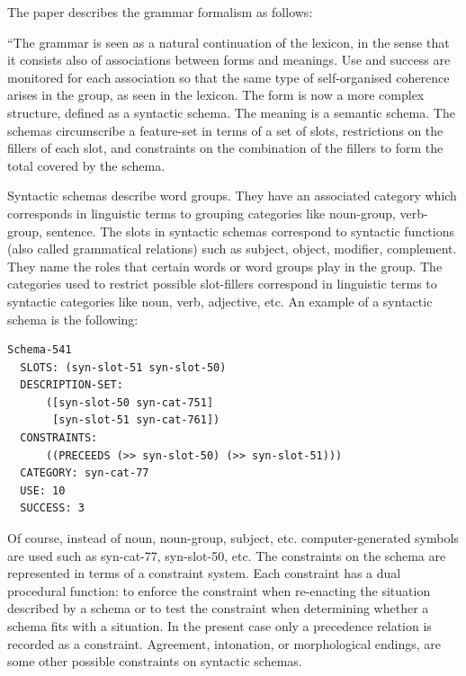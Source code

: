 The paper describes the grammar formalism as follows:

``The grammar is seen as a natural continuation of the lexicon, in the sense that it consists also of associations between forms and meanings. Use and success are monitored for each association so that the same type of self-organised coherence arises in the group, as seen in the lexicon. The form is now a more complex structure, defined as a syntactic schema. The meaning is a semantic schema. The schemas
circumscribe a feature-set in terms of a set of slots, restrictions	
on the fillers of each slot, and constraints	on the combination	
of the fillers to form the total covered by the schema. 

Syntactic schemas describe word groups. They have an associated category which corresponds in linguistic terms to grouping categories like noun-group, verb-group, sentence. The slots in syntactic schemas correspond to syntactic functions (also called grammatical relations) such as subject, object, modifier, complement. They name the roles that certain words or word groups play in the group. The categories used to restrict possible slot-fillers correspond in linguistic terms to syntactic categories like noun, verb, adjective, etc. An example of a syntactic schema is the following:
\begin{verbatim}
Schema-541 
  SLOTS: (syn-slot-51 syn-slot-50) 
  DESCRIPTION-SET: 
      ([syn-slot-50 syn-cat-751] 
       [syn-slot-51 syn-cat-761])
  CONSTRAINTS:
      ((PRECEEDS (>> syn-slot-50) (>> syn-slot-51)))
  CATEGORY: syn-cat-77 
  USE: 10 
  SUCCESS: 3
\end{verbatim}
Of course, instead of noun, noun-group, subject, etc. computer-generated symbols are used such 
as syn-cat-77, syn-slot-50, etc. The constraints on the schema are represented in terms of
a constraint system. Each constraint
has a dual procedural function: to enforce the constraint when re-enacting the situation
described by a schema or to test the constraint when determining whether a schema fits with a situation. In the present
case only a precedence relation is recorded as a constraint. Agreement, intonation, or morphological
endings, are some other possible constraints on syntactic schemas.

